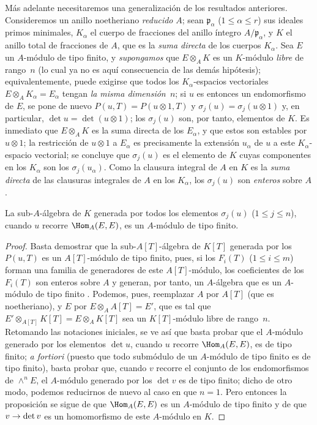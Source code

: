 \documentclass[oneside,10pt]{amsart}
\makeatletter
\renewcommand{\leq}{\leqslant}
\newcommand{\ega@arrow}[2]{\mathchoice{#1}{#2}{#2}{#2}}
\renewcommand{\to}{\ega@arrow{\longrightarrow}{\rightarrow}}
\newcommand{\oldpage}[2][]{\marginnote{\normalfont\footnotesize\textbf{#1}~|~#2}\ignorespaces}
\let\EGAOriginalLabel\label
\renewcommand{\label}[1]{\phantomsection\EGAOriginalLabel{#1}}
\makeatother
\begin{document}
\begin{remark}[6.4.7]
\label{II.6.4.7}
Más adelante necesitaremos una generalización de los resultados anteriores.
Consideremos un anillo noetheriano \emph{reducido} $A$;
sean $\mathfrak{p}_\alpha$ ($1\leq\alpha\leq r$) sus ideales primos minimales, $K_\alpha$ el cuerpo de fracciones del anillo íntegro $A/\mathfrak{p}_\alpha$, y $K$ el anillo total de fracciones de $A$, que es la \emph{suma directa} de los cuerpos $K_\alpha$.
Sea $E$ un $A$-módulo de tipo finito, y \emph{supongamos} que $E\otimes_A K$ es un $K$-módulo \emph{libre} de rango~$n$ (lo cual ya no es aquí consecuencia de las demás hipótesis);
equivalentemente, puede exigirse que todos los $K_\alpha$-espacios vectoriales $E\otimes_A K_\alpha=E_\alpha$ tengan \emph{la misma dimensión~$n$};
si $u$ es entonces un endomorfismo de $E$, se pone de nuevo $P(u,T)=P(u\otimes1,T)$ y $\sigma_j(u)=\sigma_j(u\otimes1)$ y, en particular, $\det u=\det(u\otimes1)$;
los $\sigma_j(u)$ son, por tanto, elementos de $K$.
Es inmediato que $E\otimes_A K$ es la suma directa de los $E_\alpha$, y que estos son estables por $u\otimes1$;
la restricción de $u\otimes1$ a $E_\alpha$ es precisamente la extensión $u_\alpha$ de $u$ a este $K_\alpha$-espacio vectorial;
se concluye que $\sigma_j(u)$ es el elemento de $K$ cuyas componentes en los $K_\alpha$ son los $\sigma_j(u_\alpha)$.
Como la clausura integral de $A$ en $K$ es la \emph{suma directa} de las clausuras integrales de $A$ en los $K_\alpha$, los $\sigma_j(u)$ son \emph{enteros} sobre $A$.

\begin{lemma}[6.4.7.1]
\label{II.6.4.7.1}
La sub-$A$-álgebra de $K$ generada por todos los elementos $\sigma_j(u)$ ($1\leq j\leq n$), cuando $u$ recorre $\Hom_A(E,E)$, es un $A$-módulo de tipo finito.
\end{lemma}

\begin{proof}
Basta demostrar que la sub-$A[T]$-álgebra de $K[T]$ generada por los $P(u,T)$ es un $A[T]$-módulo de tipo finito, pues, si los $F_i(T)$ ($1\leq i\leq m$) forman una familia de generadores de este $A[T]$-módulo, los coeficientes de los $F_i(T)$ son enteros sobre $A$ y generan, por tanto, un $A$-álgebra que es un $A$-módulo de tipo finito \cite[t.~I, p.~255, th.~1]{I-13}.
\oldpage[II]{123}
Podemos, pues, reemplazar $A$ por $A[T]$ (que es noetheriano), y $E$ por $E\otimes_A A[T]=E'$, que es tal que $E'\otimes_{A[T]}K[T]=E\otimes_A K[T]$ sea un $K[T]$-módulo libre de rango~$n$.
Retomando las notaciones iniciales, se ve así que basta probar que el $A$-módulo generado por los elementos $\det u$, cuando $u$ recorre $\Hom_A(E,E)$, es de tipo finito;
\emph{a fortiori} (puesto que todo submódulo de un $A$-módulo de tipo finito es de tipo finito), basta probar que, cuando $v$ recorre el conjunto de los endomorfismos de $\wedge^n E$, el $A$-módulo generado por los $\det v$ es de tipo finito;
dicho de otro modo, podemos reducirnos de nuevo al caso en que $n=1$.
Pero entonces la proposición se sigue de que $\Hom_A(E,E)$ es un $A$-módulo de tipo finito y de que $v\to\det v$ es un homomorfismo de este $A$-módulo en $K$.
\end{proof}


\end{remark}
\end{document}

